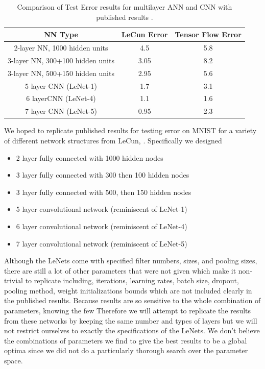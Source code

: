 \documentclass[12pt, twocolumn]{article}
\begin{document}
\begin{table}
\begin{center}
\begin{tabular} { |c | c | c | }
    \hline
    NN Type & LeCun Error  &   Tensor Flow Error \\ \hline
    2-layer NN, 1000 hidden units & 4.5  & 5.8\\ \hline
    3-layer NN, 300+100 hidden units & 3.05  & 8.2 \\ \hline
    3-layer NN, 500+150 hidden units & 2.95  & 5.6\\ \hline
    5 layer CNN  (LeNet-1) & 1.7  & 3.1\\ \hline 
    6 layerCNN (LeNet-4) & 1.1 & 1.6\\ \hline 
    7 layer CNN (LeNet-5) &  0.95  & 2.3\\ \hline
  \end{tabular}
\caption{Comparison of Test Error results for multilayer ANN and CNN with published results \cite{LeCun1998}.}
\label{table:MNISTLeCun}
\end{center}
\end{table}


We hoped to replicate published results for testing error on MNIST for a variety of different network structures from LeCun, \cite{LeCun1998}. Specifically we designed

\begin{itemize}
\item{2 layer fully connected with 1000 hidden nodes}
\item{3 layer fully connected with 300 then 100 hidden nodes}
\item{3 layer fully connected with 500, then 150 hidden nodes}
\item{5 layer convolutional network (reminiscent of LeNet-1)}
\item{6 layer convolutional network (reminiscent of LeNet-4)}
\item{7 layer convolutional network (reminiscent of LeNet-5)}
\end{itemize}


Although the LeNets come with specified filter numbers, sizes, and pooling sizes, there are still a lot of other parameters that were not given which make it non-trivial to replicate including, iterations, learning rates, batch size, dropout, pooling method, weight initializations bounds which are not included clearly in the published results. Because results are so sensitive to the whole combination of parameters, knowing the few  Therefore we will attempt to replicate the results from these networks by keeping the same number and types of layers but we will not restrict ourselves to exactly the specifications of the LeNets. We don't  believe the combinations of parameters we find to give the best results to be a global optima since we did not do a particularly thorough search over the parameter space. 
\end{document}
